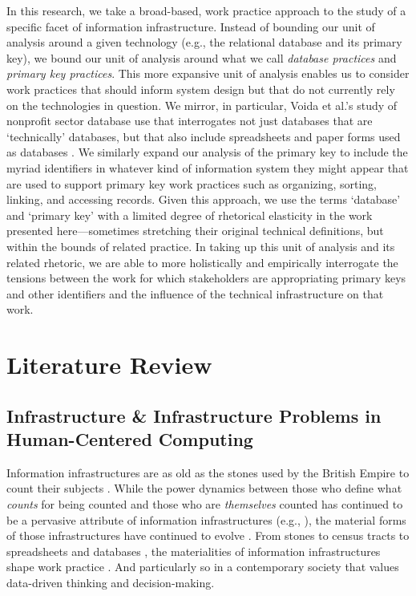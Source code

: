 In this research, we take a broad-based, work practice approach to the study of a specific facet of information infrastructure. Instead of bounding our unit of analysis around a given technology (e.g., the relational database and its primary key), we bound our unit of analysis around what we call \textit{database practices} and \textit{primary key practices}.  This more expansive unit of analysis enables us to consider work practices that should inform system design but that do not currently rely on the technologies in question. We mirror, in particular, Voida et al.'s  study of nonprofit sector database use that interrogates not just databases that are `technically' databases, but that also include spreadsheets and paper forms used as databases \citep{Voida2011Homebrew}.  We similarly expand our analysis of the primary key to include the myriad identifiers in whatever kind of information system they might appear that are used to support primary key work practices such as organizing, sorting, linking, and accessing records. Given this approach, we use the terms `database' and `primary key' with a limited degree of rhetorical elasticity in the work presented here---sometimes stretching their original technical definitions, but within the bounds of related practice. In taking up this unit of analysis and its related rhetoric, we are able to more holistically and empirically interrogate the tensions between the work for which stakeholders are appropriating primary keys and other identifiers and the influence of the technical infrastructure on that work.

\section{Literature Review}
\subsection{Infrastructure \& Infrastructure Problems in Human-Centered Computing}
Information infrastructures are as old as the stones used by the British Empire to count their subjects \citep{Verran2001Science}. While the power dynamics between those who define what \textit{counts} for being counted and those who are \textit{themselves} counted has continued to be a pervasive attribute of information infrastructures (e.g., \citep{Martin2009Counting,Nelson2015Counts,Scott1998Seeing}), the material forms of those infrastructures have continued to evolve \citep{Dourish2017Stuff}. From stones \citep{Verran2001Science} to census tracts \citep{Scott1998Seeing} to spreadsheets \citep{Dourish2017Stuff,Vertesi2019Affordances} and databases \citep{Dourish2017Stuff,Manovich2002Language}, the materialities of information infrastructures shape work practice \citep{Dourish2012Media,Orlikowski2010Sociomateriality}. And particularly so in a contemporary society that values data-driven thinking and decision-making.

